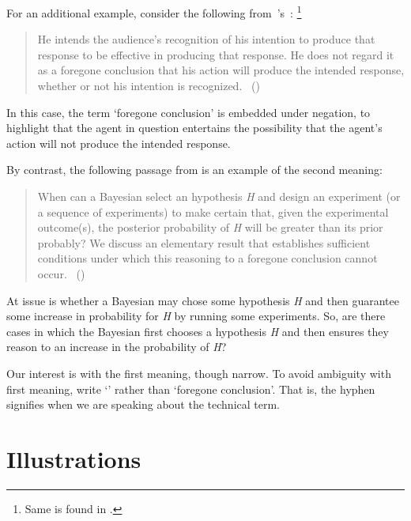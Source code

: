 \begin{note}
  For an additional example, consider the following from~\citeauthor{Grice:1957vg}'s~:%
  \footnote{
    Same is found in \textcite[219]{Grice:1989uf}.
  }
  \begin{quote}
    He intends the audience's recognition of his intention to produce that response to be effective in producing that response.
    He does not regard it as a foregone conclusion that his action will produce the intended response, whether or not his intention is recognized.\newline
    \mbox{ }\hfill\mbox{(\citeyear[385]{Grice:1957vg})}
  \end{quote}

  In this case, the term `foregone conclusion' is embedded under negation, to highlight that the agent in question entertains the possibility that the agent's action will not produce the intended response.

  By contrast, the following passage from \textcite{Kadane:1996vu} is an example of the second meaning:

  \begin{quote}
    When can a Bayesian select an hypothesis \emph{H} and design an experiment (or a sequence of experiments) to make certain that, given the experimental outcome(s), the posterior probability of \emph{H} will be greater than its prior probably?
    We discuss an elementary result that establishes sufficient conditions under which this reasoning to a foregone conclusion cannot occur.%
    \mbox{ }\hfill\mbox{(\citeyear[1228]{Kadane:1996vu})}
  \end{quote}

  At issue is whether a Bayesian may chose some hypothesis \emph{H} and then guarantee some increase in probability for \emph{H} by running some experiments.
  So, are there cases in which the Bayesian first chooses a hypothesis \emph{H} and then ensures they reason to an increase in the probability of \emph{H}?
\end{note}

\begin{note}
  Our interest is with the first meaning, though narrow.
  To avoid ambiguity with first meaning, write `' rather than `foregone conclusion'.
  That is, the hyphen signifies when we are speaking about the technical term.
\end{note}

\section{Illustrations}

